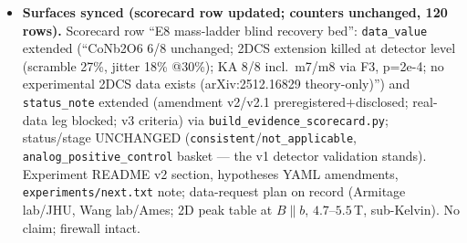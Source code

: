 \begin{itemize}[leftmargin=1.5em]
coincidence-based coverage and a sparser catalog, preregistered BEFORE real data exists.
\item \textbf{Surfaces synced (scorecard row updated; counters unchanged, 120 rows).} Scorecard row
``E8 mass-ladder blind recovery bed'': \texttt{data\_value} extended (``CoNb2O6 6/8 unchanged; 2DCS
extension killed at detector level (scramble 27\%, jitter 18\% @30\%); KA 8/8 incl.\ m7/m8 via F3,
p=2e-4; no experimental 2DCS data exists (arXiv:2512.16829 theory-only)'') and
\texttt{status\_note} extended (amendment v2/v2.1 preregistered$+$disclosed; real-data leg blocked;
v3 criteria) via \texttt{build\_evidence\_scorecard.py}; status/stage UNCHANGED
(\texttt{consistent}/\texttt{not\_applicable}, \texttt{analog\_positive\_control} basket --- the v1
detector validation stands). Experiment README v2 section, hypotheses YAML amendments,
\texttt{experiments/next.txt} note; data-request plan on record (Armitage lab/JHU, Wang lab/Ames;
2D peak table at $B\parallel b$, $4.7$--$5.5$\,T, sub-Kelvin). No claim; firewall intact.
\end{itemize}

